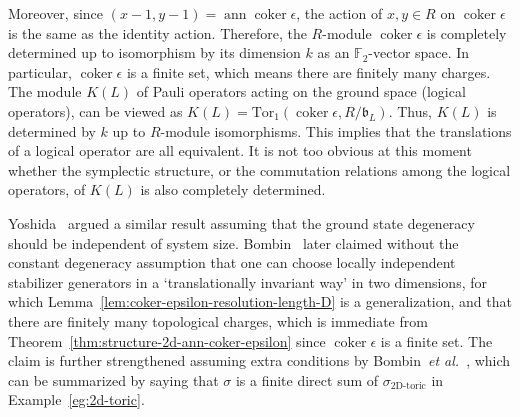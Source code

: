 \documentclass[letterpaper,12pt]{amsart}
\theoremstyle{definition} \newtheorem{defn}{Definition}
\theoremstyle{definition} \newtheorem{rem}{Remark}
\theoremstyle{definition} \newtheorem{example}{Example}
\newcommand{\coker}{\mathop{\mathrm{coker}}}
\newcommand{\ann}{\mathop{\mathrm{ann}}}
\newcommand{\Tor}{{\mathrm{Tor}}}
\newcommand{\FF}{\mathbb{F}}
\newcommand{\bb}{\mathfrak{b}}
\begin{document}
Moreover, since $(x-1,y-1) = \ann \coker \epsilon$,
the action of $x,y \in R$ on $\coker \epsilon$ is the same as the identity action.
Therefore, the $R$-module $\coker \epsilon$ is completely determined
up to isomorphism by its dimension $k$ as an $\FF_2$-vector space.
In particular, $\coker \epsilon$ is a finite set,
which means there are finitely many charges.
The module $K(L)$ of Pauli operators acting on the ground space (logical operators),
can be viewed as $K(L) = \Tor_1(\coker \epsilon, R/\bb_L)$.
Thus, $K(L)$ is determined by $k$ up to $R$-module isomorphisms.
This implies that the translations of a logical operator are all equivalent.
It is not too obvious at this moment whether the symplectic structure,
or the commutation relations among the logical operators,
of $K(L)$ is also completely determined.

Yoshida~\cite{Yoshida2011Classification} argued a similar result assuming
that the ground state degeneracy should be independent of system size.
Bombin~\cite{Bombin2011Structure} later claimed without the constant degeneracy assumption
that one can choose locally independent stabilizer generators in a `translationally invariant way'
in two dimensions, for which Lemma~\ref{lem:coker-epsilon-resolution-length-D} is a generalization,
and that there are finitely many topological charges,
which is immediate from Theorem~\ref{thm:structure-2d-ann-coker-epsilon} since $\coker \epsilon$ is a finite set.
The claim is further strengthened assuming extra conditions by Bombin~\emph{et al.}~\cite{BombinDuclosCianciPoulin2012},
which can be summarized by saying
that $\sigma$ is a finite direct sum of $\sigma_\text{2D-toric}$ in Example~\ref{eg:2d-toric}.
\end{document}
